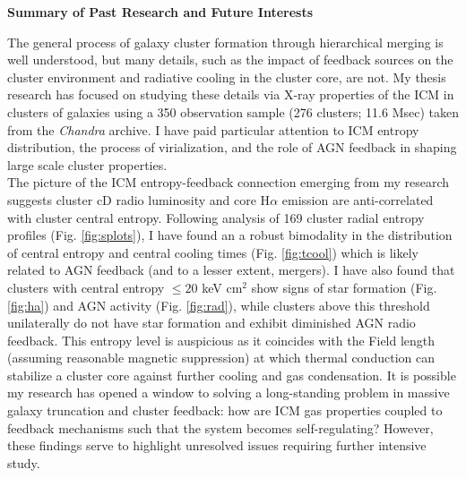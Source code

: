 \documentclass[11pt]{article}
\begin{document}
\begin{center}
\textbf{Summary of Past Research and Future Interests}
\end{center}

The general process of galaxy cluster formation through hierarchical
merging is well understood, but many details, such as the impact of
feedback sources on the cluster environment and radiative cooling in
the cluster core, are not. My thesis research has focused on studying
these details via X-ray properties of the ICM in clusters of galaxies
using a 350 observation sample (276 clusters; 11.6 Msec) taken from
the {\it Chandra} archive. I have paid particular attention to ICM
entropy distribution, the process of virialization, and the role of
AGN feedback in shaping large scale cluster properties.\\

The picture of the ICM entropy-feedback connection emerging from my
research suggests cluster cD radio luminosity and core H$\alpha$
emission are anti-correlated with cluster central entropy. Following
analysis of 169 cluster radial entropy profiles
(Fig. \ref{fig:splots}), I have found an a robust bimodality in the
distribution of central entropy and central cooling times
(Fig. \ref{fig:tcool}) which is likely related to AGN feedback (and to
a lesser extent, mergers). I have also found that clusters with
central entropy $\leq 20$ keV cm$^2$ show signs of star formation
(Fig. \ref{fig:ha}) and AGN activity (Fig. \ref{fig:rad}), while
clusters above this threshold unilaterally do not have star formation
and exhibit diminished AGN radio feedback. This entropy level is
auspicious as it coincides with the Field length (assuming reasonable
magnetic suppression) at which thermal conduction can stabilize a
cluster core against further cooling and gas condensation. It is
possible my research has opened a window to solving a long-standing
problem in massive galaxy truncation and cluster feedback: how are ICM
gas properties coupled to feedback mechanisms such that the system
becomes self-regulating? However, these findings serve to highlight
unresolved issues requiring further intensive study.\\
\end{document}
